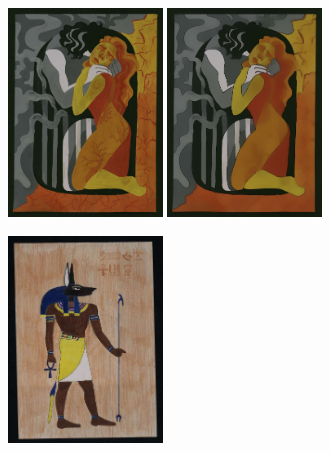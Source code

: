 \begin{figure}
\begin{subfigure}[b]{0.5\textwidth}
         \caption{}
     \end{subfigure}
     \hfil
     \begin{subfigure}[b]{0.5\textwidth}
         \centering
         \includegraphics[width=0.45\textwidth]{images/style_augments/2020_14-17_2051_UKR_R_C.jpg}\hfil
         \includegraphics[width=0.45\textwidth]{images/style_augments/2020_14-17_2051_UKR_R_C_water.jpg}
         \caption{}
     \end{subfigure}
     \hfil
     \begin{subfigure}[b]{0.5\textwidth}
         \centering
         \includegraphics[width=0.45\textwidth]{images/style_augments/2019_14-17_0188_RUS_R_C.jpg}\hfil

\end{subfigure}
\end{figure}
